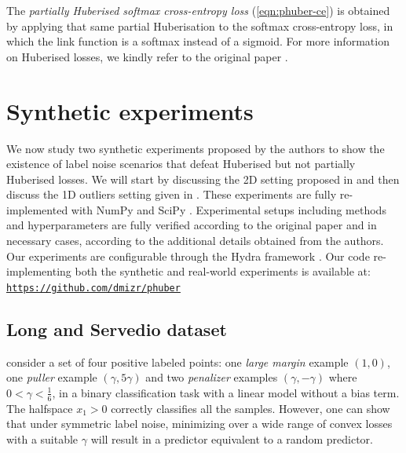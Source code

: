 The \emph{partially Huberised softmax cross-entropy loss} (\autoref{eqn:phuber-ce}) is obtained by applying that same partial Huberisation to the softmax cross-entropy loss, in which the link function is a softmax instead of a sigmoid. For more information on Huberised losses, we kindly refer to the original paper \citep{menon_can_2019}.

\section{Synthetic experiments}
\label{sec:synthetic}

We now study two synthetic experiments proposed by the authors to show the existence of label noise scenarios that defeat Huberised but not partially Huberised losses. We will start by discussing the 2D setting proposed in \citet{long_random_2010} and then discuss the 1D outliers setting given in \citet{ding_statistical_2013}. These experiments are fully re-implemented with NumPy \citep{harris_array_2020} and SciPy \citep{virtanen_scipy_2020}. Experimental setups including methods and hyperparameters are fully verified according to the original paper and in necessary cases, according to the additional details obtained from the authors. Our experiments are configurable through the Hydra framework \citep{yadan_hydra_2019}. Our code re-implementing both the synthetic and real-world experiments is available at: \texttt{\url{https://github.com/dmizr/phuber}}

\subsection{Long and Servedio dataset}
\label{sec:long&servedio}

\citet{long_random_2010} consider a set of four positive labeled points: one \textit{large margin} example $(1,0)$, one \textit{puller} example $(\gamma, 5\gamma)$ and two \textit{penalizer} examples $(\gamma, -\gamma)$ where $0 < \gamma < \frac{1}{6}$, in a binary classification task with a linear model without a bias term.
The halfspace $x_1 > 0$ correctly classifies all the samples.
However, one can show that under symmetric label noise, minimizing over a wide range of convex losses with a suitable $\gamma$ will result in a predictor equivalent to a random predictor.

